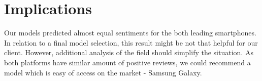 \documentclass[12]{article}
\begin{document}
\section{Implications}
Our models predicted almost equal sentiments for the both leading smartphones. In relation to a final model selection, this result might be not that helpful for our client. However, additional analysis of the field should simplify the situation. As both platforms have similar amount of positive reviews, we could recommend a model which is easy of access on the market - Samsung Galaxy. 
\end{document}
